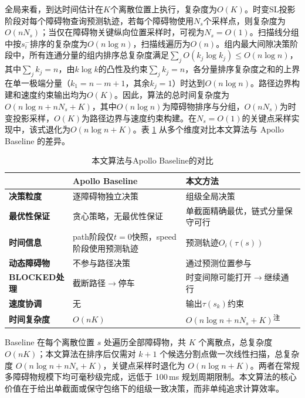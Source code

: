全局来看，到达时间估计在$K$个离散位置上执行，复杂度为$O(K)$。时变SL投影阶段对每个障碍物查询预测轨迹，若每个障碍物使用$N_s$个采样点，则复杂度为$O(nN_s)$；当仅在障碍物关键纵向位置采样时，可视为$N_s=O(1)$。扫描线分组中按$s_i^{-}$排序的复杂度为$O(n \log n)$，扫描线遍历为$O(n)$。组内最大间隙决策阶段中，所有连通分量的组内排序总复杂度满足$\sum_j O(k_j \log k_j) \leq O(n \log n)$，其中$\sum_j k_j = n$，由$k \log k$的凸性及约束$\sum_j k_j = n$，各分量排序复杂度之和的上界在单一极端分量（$k_1 = n-m+1$，其余$k_j = 1$）时达到$O(n \log n)$。路径边界构建和速度约束输出均为$O(K)$。因此，算法的总时间复杂度为$O(n \log n + nN_s + K)$，其中$O(n \log n)$为障碍物排序与分组，$O(nN_s)$为时变投影采样，$O(K)$为路径边界与速度约束构建。在$N_s=O(1)$的关键点采样实现中，该式退化为$O(n \log n + K)$。表 \ref{tab:algo_compare} 从多个维度对比本文算法与 Apollo Baseline 的差异。

\begin{table}[htbp]
\centering
\caption{本文算法与Apollo Baseline的对比}
\label{tab:algo_compare}
\small
\begin{tabularx}{\textwidth}{lXX}
\toprule
& \textbf{Apollo Baseline} & \textbf{本文方法} \\
\midrule
\textbf{决策粒度} & 逐障碍物独立决策 & 组级全局决策 \\
\textbf{最优性保证} & 贪心策略，无最优性保证 & 单截面精确最优，链式分量保守可行 \\
\textbf{时间信息} & path阶段仅$t=0$快照，speed阶段使用预测轨迹 & 预测轨迹$O_i(\tau(s))$ \\
\textbf{动态障碍物} & 不参与路径决策 & 通过预测位置参与 \\
\textbf{BLOCKED处理} & 截断路径$\to$停车 & 时变间隙可能打开$\to$继续通行 \\
\textbf{速度协调} & 无 & 输出$\tau(s_k)$约束 \\
\textbf{时间复杂度} & $O(nK)$ & $O(n \log n + nN_s + K)$\textsuperscript{注} \\
\bottomrule
\end{tabularx}
\par{}
\end{table}

Baseline 在每个离散位置 $s$ 处遍历全部障碍物，共 $K$ 个离散点，总复杂度 $O(nK)$；本文算法在排序后仅需对 $k+1$ 个候选分割点做一次线性扫描，总复杂度 $O(n\log n + nN_s + K)$，关键点采样时退化为 $O(n\log n + K)$。两者在常规多障碍物规模下均可毫秒级完成，远低于 100\,ms 规划周期限制。本文算法的核心价值在于给出单截面或保守包络下的组级一致决策，而非单纯追求计算效率。


